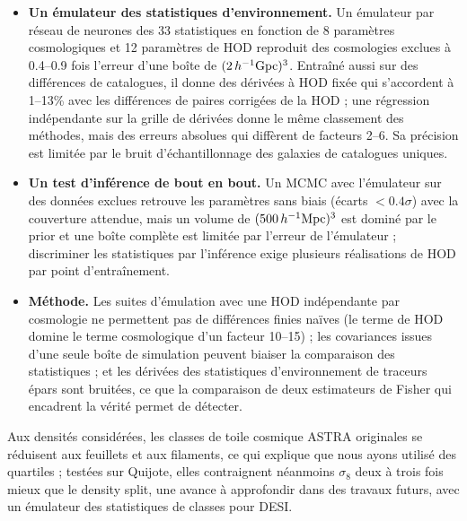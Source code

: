\begin{itemize}
\item \textbf{Un émulateur des statistiques d'environnement.} Un émulateur par réseau de neurones des 33 statistiques en fonction de 8 paramètres cosmologiques et 12 paramètres de HOD reproduit des cosmologies exclues à 0.4--0.9 fois l'erreur d'une boîte de $(2\,h^{-1}{\rm Gpc})^3$. Entraîné aussi sur des différences de catalogues, il donne des dérivées à HOD fixée qui s'accordent à 1--13\% avec les différences de paires corrigées de la HOD ; une régression indépendante sur la grille de dérivées donne le même classement des méthodes, mais des erreurs absolues qui diffèrent de facteurs 2--6. Sa précision est limitée par le bruit d'échantillonnage des galaxies de catalogues uniques.
\item \textbf{Un test d'inférence de bout en bout.} Un MCMC avec l'émulateur sur des données exclues retrouve les paramètres sans biais (écarts $<0.4\sigma$) avec la couverture attendue, mais un volume de $(500\,h^{-1}\mathrm{Mpc})^3$ est dominé par le prior et une boîte complète est limitée par l'erreur de l'émulateur ; discriminer les statistiques par l'inférence exige plusieurs réalisations de HOD par point d'entraînement.
\item \textbf{Méthode.} Les suites d'émulation avec une HOD indépendante par cosmologie ne permettent pas de différences finies naïves (le terme de HOD domine le terme cosmologique d'un facteur 10--15) ; les covariances issues d'une seule boîte de simulation peuvent biaiser la comparaison des statistiques ; et les dérivées des statistiques d'environnement de traceurs épars sont bruitées, ce que la comparaison de deux estimateurs de Fisher qui encadrent la vérité permet de détecter.
\end{itemize}
Aux densités considérées, les classes de toile cosmique ASTRA originales se réduisent aux feuillets et aux filaments, ce qui explique que nous ayons utilisé des quartiles ; testées sur Quijote, elles contraignent néanmoins $\sigma_8$ deux à trois fois mieux que le density split, une avance à approfondir dans des travaux futurs, avec un émulateur des statistiques de classes pour DESI.
